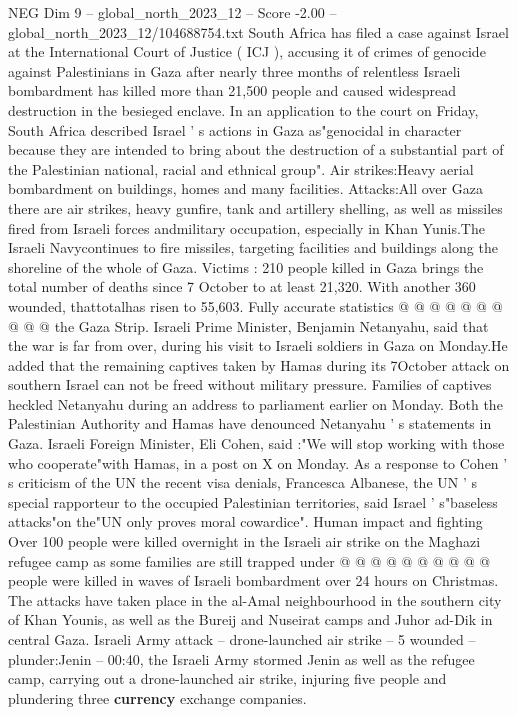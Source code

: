 \begin{textsample}{NEG Dim 9 – global\_north\_2023\_12 – Score -2.00 – global\_north\_2023\_12/104688754.txt}  \label{ex:f9_neg_294}
South Africa has filed a case against Israel at the International Court of Justice ( ICJ ), accusing it of crimes of genocide against Palestinians in Gaza after nearly three months of relentless Israeli bombardment has killed more than 21,500 people and caused widespread destruction in the besieged enclave.
In an application to the court on Friday, South Africa described Israel ' s actions in Gaza as"genocidal in character because they are intended to bring about the destruction of a substantial part of the Palestinian national, racial and ethnical group".
Air strikes:Heavy aerial bombardment on buildings, homes and many facilities.
Attacks:All over Gaza there are air strikes, heavy gunfire, tank and artillery shelling, as well as missiles fired from Israeli forces andmilitary occupation, especially in Khan Yunis.The Israeli Navycontinues to fire missiles, targeting facilities and buildings along the shoreline of the whole of Gaza.
Victims : 210 people killed in Gaza brings the total number of deaths since 7 October to at least 21,320.
With another 360 wounded, thattotalhas risen to 55,603.
Fully accurate statistics @ @ @ @ @ @ @ @ @ @ the Gaza Strip.
Israeli Prime Minister, Benjamin Netanyahu, said that the war is far from over, during his visit to Israeli soldiers in Gaza on Monday.He added that the remaining captives taken by Hamas during its 7October attack on southern Israel can not be freed without military pressure.
Families of captives heckled Netanyahu during an address to parliament earlier on Monday.
Both the Palestinian Authority and Hamas have denounced Netanyahu ' s statements in Gaza.
Israeli Foreign Minister, Eli Cohen, said :"We will stop working with those who cooperate"with Hamas, in a post on X on Monday.
As a response to Cohen ' s criticism of the UN the recent visa denials, Francesca Albanese, the UN ' s special rapporteur to the occupied Palestinian territories, said Israel ' s"baseless attacks"on the"UN only proves moral cowardice".
Human impact and fighting Over 100 people were killed overnight in the Israeli air strike on the Maghazi refugee camp as some families are still trapped under @ @ @ @ @ @ @ @ @ @ people were killed in waves of Israeli bombardment over 24 hours on Christmas.
The attacks have taken place in the al-Amal neighbourhood in the southern city of Khan Younis, as well as the Bureij and Nuseirat camps and Juhor ad-Dik in central Gaza.
Israeli Army attack -- drone-launched air strike -- 5 wounded -- plunder:Jenin -- 00:40, the Israeli Army stormed Jenin as well as the refugee camp, carrying out a drone-launched air strike, injuring five people and plundering three \textbf{currency} exchange companies.

\end{textsample}
